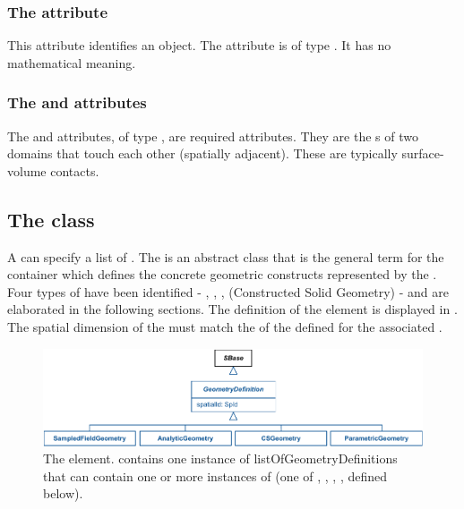 \subsubsection{The  attribute}
This attribute identifies an \AdjacentDomains object. The attribute is of type .  It has no mathematical meaning.

\subsubsection{The  and  attributes}
The  and  attributes, of type , are required attributes. They are the s of two domains that touch each other (spatially adjacent).  These are typically surface-volume contacts.


\subsection{The  class}
\label{GeometryDefinition-class}
A \Geometry can specify a list of \GeometryDefinitions. The \GeometryDefinition is an abstract class that is the general term for the container which defines the concrete geometric constructs represented by the \Geometry. Four types of \GeometryDefinitions have been identified - \AnalyticGeometry, \SampledFieldGeometry, \ParametricGeometry, \CSGeometry (Constructed Solid Geometry) - and are elaborated in the following sections. The definition of the \GeometryDefinition element is displayed in .  The spatial dimension of the \GeometryDefinition must match the  of the \DomainType defined for the associated \Domain.

\begin{figure}[ht]
  \includegraphics{figs/GeometryDefinition-uml}
  \caption{The \GeometryDefinition element. \Geometry contains one instance of listOfGeometryDefinitions that can contain one or more instances of \GeometryDefinition (one of \AnalyticGeometry, \SampledFieldGeometry, \CSGeometry, \ParametricGeometry, defined below).}
  \label{GeometryDefinition-uml}
\end{figure}

